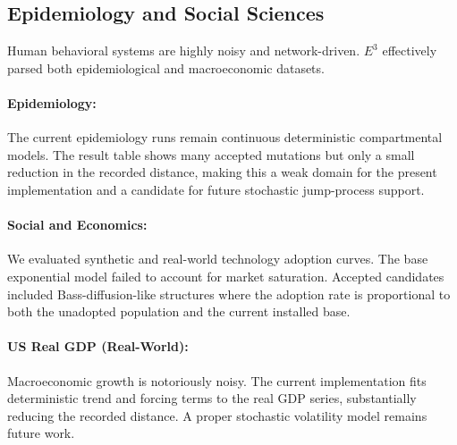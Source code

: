 \subsection{Epidemiology and Social Sciences}

Human behavioral systems are highly noisy and network-driven. $E^3$ effectively parsed both epidemiological and macroeconomic datasets.

\paragraph{Epidemiology:} The current epidemiology runs remain continuous deterministic compartmental models. The result table shows many accepted mutations but only a small reduction in the recorded distance, making this a weak domain for the present implementation and a candidate for future stochastic jump-process support.
\paragraph{Social and Economics:} We evaluated synthetic and real-world technology adoption curves. The base exponential model failed to account for market saturation. Accepted candidates included Bass-diffusion-like structures where the adoption rate is proportional to both the unadopted population and the current installed base.
\paragraph{US Real GDP (Real-World):} Macroeconomic growth is notoriously noisy. The current implementation fits deterministic trend and forcing terms to the real GDP series, substantially reducing the recorded distance. A proper stochastic volatility model remains future work.
